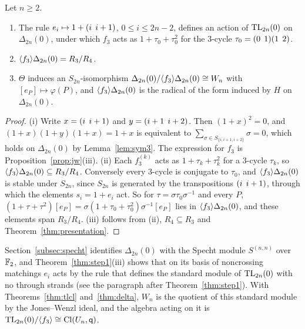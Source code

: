 \begin{theorem}\label{thm:delta}
Let $n\ge2$.
\begin{enumerate}
\item The rule $e_i\mapsto1+(i\;\,i+1)$, $0\le i\le2n-2$, defines an action of $\mathrm{TL}_{2n}(0)$ on $\Delta_{2n}(0)$, under which $f_3$ acts as $1+\tau_0+\tau_0^2$ for the $3$-cycle $\tau_0=(0\;\,1)(1\;\,2)$.
\item $\langle f_3\rangle\Delta_{2n}(0)=R_3/R_4$.
\item $\Theta$ induces an $S_{2n}$-isomorphism $\Delta_{2n}(0)/\langle f_3\rangle\Delta_{2n}(0)\cong W_n$ with $[e_P]\mapsto\varphi(P)$, and $\langle f_3\rangle\Delta_{2n}(0)$ is the radical of the form induced by $H$ on $\Delta_{2n}(0)$.
\end{enumerate}
\end{theorem}

\begin{proof}
(i) Write $x=(i\;\,i+1)$ and $y=(i+1\;\,i+2)$. Then ${(1+x)}^2=0$, and $(1+x)(1+y)(1+x)=1+x$ is equivalent to $\sum_{\sigma\in S_{\{i,i+1,i+2\}}}\sigma=0$, which holds on $\Delta_{2n}(0)$ by Lemma~\ref{lem:sym3}. The expression for $f_3$ is Proposition~\ref{prop:jw}(iii). (ii) Each $f_3^{(k)}$ acts as $1+\tau_k+\tau_k^2$ for a $3$-cycle $\tau_k$, so $\langle f_3\rangle\Delta_{2n}(0)\subseteq R_3/R_4$. Conversely every $3$-cycle is conjugate to $\tau_0$, and $\langle f_3\rangle\Delta_{2n}(0)$ is stable under $S_{2n}$, since $S_{2n}$ is generated by the transpositions $(i\;\,i+1)$, through which the elements $s_i=1+e_i$ act. So for $\tau=\sigma\tau_0\sigma^{-1}$ and every $P$, $(1+\tau+\tau^2)[e_P]=\sigma(1+\tau_0+\tau_0^2)\sigma^{-1}[e_P]$ lies in $\langle f_3\rangle\Delta_{2n}(0)$, and these elements span $R_3/R_4$. (iii) follows from (ii), $R_4\subseteq R_3$ and Theorem~\ref{thm:presentation}.
\end{proof}

Section~\ref{subsec:specht} identifies $\Delta_{2n}(0)$ with the Specht module $S^{(n,n)}$ over $\mathbb{F}_2$, and Theorem~\ref{thm:step1}(iii) shows that on its basis of noncrossing matchings $e_i$ acts by the rule that defines the standard module of $\mathrm{TL}_{2n}(0)$ with no through strands (see the paragraph after Theorem~\ref{thm:step1}). With Theorems~\ref{thm:tlcl} and~\ref{thm:delta}, $W_n$ is the quotient of this standard module by the Jones--Wenzl ideal, and the algebra acting on it is $\mathrm{TL}_{2n}(0)/\langle f_3\rangle\cong\operatorname{Cl}(U_n,\mathsf{q})$. %
